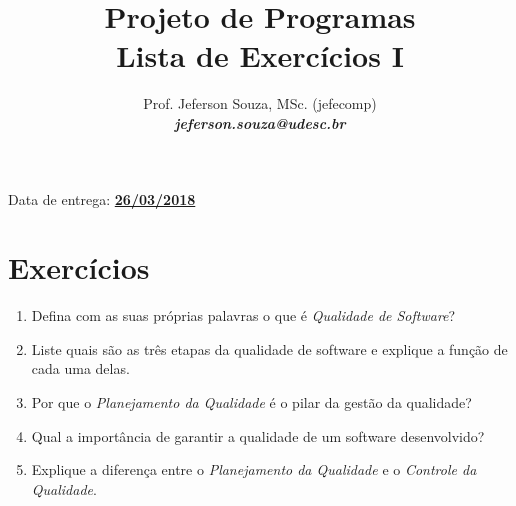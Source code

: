 \documentclass[12pt]{article}
\title{Projeto de Programas \\ Lista de Exercícios I}
\author{Prof. Jeferson Souza, MSc. (jefecomp) \\[3mm]
\textbf{\textit{jeferson.souza@udesc.br}}}
\date{}
\begin{document}
\maketitle

\centering Data de entrega: \textbf{\underline{26/03/2018}}

\section*{Exercícios}

\begin{enumerate}
\itemsep 10mm

\item Defina com as suas próprias palavras o que é \textit{Qualidade de Software}?

\item Liste quais são as três etapas da qualidade de software e explique a função de cada uma delas.

\item Por que o \textit{Planejamento da Qualidade} é o pilar da gestão da qualidade?

\item Qual a importância de garantir a qualidade de um software desenvolvido?

\item Explique a diferença entre o \textit{Planejamento da Qualidade} e o \textit{Controle da Qualidade}.

\end{enumerate}
\end{document}
